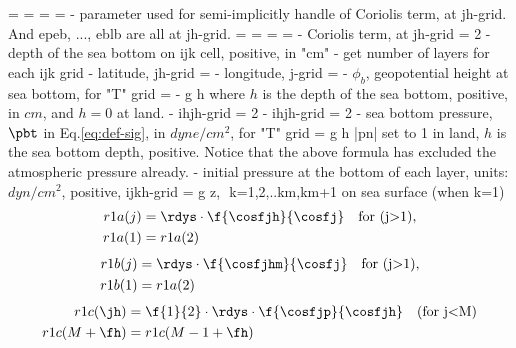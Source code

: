    \be
    = 
   \ee
{}
   \be
    = 
   \ee
{}
   \be
    = 
   \ee
{}
   \be
    = 
   \ee
{} - parameter used for semi-implicitly handle of Coriolis term, 
   at jh-grid. And epeb, ..., eblb are all at jh-grid.
   \be
    = 
   \ee
{}
   \be
    = 
   \ee
{}
   \be
    = 
   \ee
{}
   \be
    = 
   \ee
{} - Coriolis term, at jh-grid
   \be
    = 2 \Omega \sin \varphi
   \ee
{} - depth of the sea bottom on ijk cell, positive, in "cm"
 - get number of layers for each ijk grid
 - latitude, jh-grid
   \be
      = 
   \ee
{} - longitude, j-grid
   \be
      = 
   \ee
{} - $\phi_b$, geopotential height at sea bottom, for "T" grid
   \be
    = - g h
   \ee
   where $h$ is the depth of the sea bottom, positive, in $cm$, and $h=0$ at
   land.
 - ihjh-grid
   \be
    = 2
   \ee
{} - ihjh-grid
   \be
    = 2
   \ee
    - sea bottom pressure, $\pbt$ in Eq.\ref{eq:def-sig}, in $dyne/cm^2$,
   for "T" grid
   \be
    = \rho g h
   \ee
   |pn| set to 1 in land, $h$ is the sea bottom depth, positive.
   Notice that the above formula has excluded the atmospheric pressure
   already.
 - initial pressure at the bottom of each layer, units: $dyn/cm^2$,
   positive, ijkh-grid
   \be
      = \rho g z, \,\,k=1,2,..km,km+1
    on sea surface (when k=1)
  \bese
   \begin{align}
   r1a(j) &= \rdys \cdot \f{\cosfjh}{\cosfj} \quad \text{for (j>1)},\\
   r1a(1) &=r1a(2)
   \end{align}
   \ense
{}
  \bese
   \begin{align}
   r1b(j) &= \rdys \cdot \f{\cosfjhm}{\cosfj} \quad \text{for (j>1)},\\
   r1b(1) &=r1a(2)
   \end{align}
   \ense
{}
  \bese
   \begin{align}
   r1c(\jh) &= \f{1}{2} \cdot \rdys \cdot \f{\cosfjp}{\cosfjh} \quad 
   \text{(for j<M)}\\
   r1c(M+\fh) &= r1c(M-1+\fh)
   \end{align}
 \ense
   
